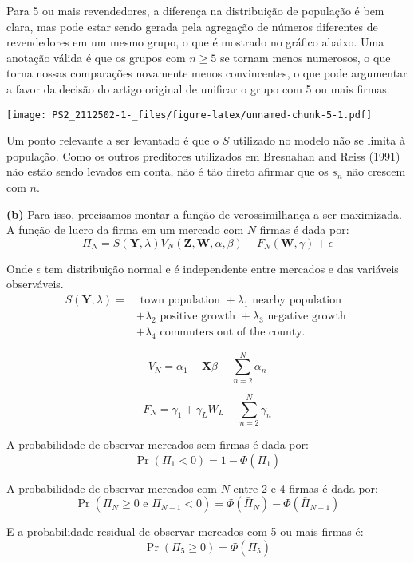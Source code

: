 \documentclass[
  12pt,
]{article}
\begin{document}
Para 5 ou mais revendedores, a diferença na distribuição de população é
bem clara, mas pode estar sendo gerada pela agregação de números
diferentes de revendedores em um mesmo grupo, o que é mostrado no
gráfico abaixo. Uma anotação válida é que os grupos com \(n \geq 5\) se
tornam menos numerosos, o que torna nossas comparações novamente menos
convincentes, o que pode argumentar a favor da decisão do artigo
original de unificar o grupo com 5 ou mais firmas.

\texttt{[image: PS2\_2112502-1-\_files/figure-latex/unnamed-chunk-5-1.pdf]}

Um ponto relevante a ser levantado é que o \(S\) utilizado no modelo não
se limita à população. Como os outros preditores utilizados em Bresnahan
and Reiss (1991) não estão sendo levados em conta, não é tão direto
afirmar que os \(s_n\) não crescem com \(n\).

\textbf{(b)} Para isso, precisamos montar a função de verossimilhança a
ser maximizada. A função de lucro da firma em um mercado com \(N\)
firmas é dada por: \[
\Pi_{N}=S(\mathbf{Y}, \lambda) V_{N}(\mathbf{Z}, \mathbf{W}, \alpha, \beta)-F_{N}(\mathbf{W}, \gamma)+\epsilon
\]

Onde \(\epsilon\) tem distribuição normal e é independente entre
mercados e das variáveis observáveis. \[
\begin{aligned}
S(\mathbf{Y}, \lambda)=& \text { town population }+\lambda_{1} \text { nearby population } \\
&+\lambda_{2} \text { positive growth }+\lambda_{3} \text { negative growth } \\
&+\lambda_{4} \text { commuters out of the county. }
\end{aligned}
\]

\[
V_{N}=\alpha_{1}+\mathbf{X} \beta-\sum_{n=2}^{N} \alpha_{n}
\]

\[
F_{N}=\gamma_{1}+\gamma_{L} W_{L}+\sum_{n=2}^{N} \gamma_{n}
\]

A probabilidade de observar mercados sem firmas é dada por: \[
\operatorname{Pr}\left(\Pi_{1}<0\right)=1-\Phi\left(\bar{\Pi}_{1}\right)
\]

A probabilidade de observar mercados com \(N\) entre 2 e 4 firmas é dada
por: \[
\operatorname{Pr}\left(\Pi_{N} \geq 0 \text { e } \Pi_{N+1}<0\right)=\Phi\left(\bar{\Pi}_{N}\right)-\Phi\left(\bar{\Pi}_{N+1}\right)
\]

E a probabilidade residual de observar mercados com 5 ou mais firmas é:
\[
\operatorname{Pr}\left(\Pi_{5} \geq 0\right)=\Phi\left(\bar{\Pi}_{5}\right)
\]
\end{document}
